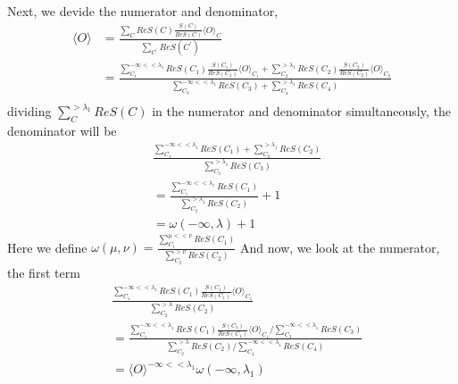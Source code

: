 \documentclass{article}
\begin{document}
    Next, we devide the numerator and denominator,
    \begin{equation}
        \begin{aligned}
            \langle O \rangle &=\frac{ \sum_{C} ReS(C) \frac{S(C)}{ReS(C)} \langle O \rangle_{C} }{ \sum_{C^{\prime}} ReS(C^{\prime}) }\\
            &=\frac{\sum^{-\infty<<\lambda_{1}}_{C_{1}} ReS(C_{1}) \frac{S(C_{1})}{ReS(C_{1})} \langle O \rangle_{C_{1}} + \sum^{>\lambda_{1}}_{C_{2}} ReS(C_{2}) \frac{S(C_{2})}{ReS(C_{2})} \langle O \rangle_{C_{2}}}
            {\sum^{-\infty<<\lambda_{1}}_{C_{3}} ReS(C_{3}) + \sum^{>\lambda_{1}}_{C_{4}} ReS(C_{4})} \\
        \end{aligned}
    \end{equation}
    dividing $\sum^{>\lambda_{1}}_{C} ReS(C)$ in the numerator and denominator simultaneously, the denominator will be
    \begin{equation}
        \begin{aligned}
            &\frac{\sum^{-\infty<<\lambda_{1}}_{C_{1}} ReS(C_{1}) + \sum^{>\lambda_{1}}_{C_{2}} ReS(C_{2})}{\sum^{>\lambda_{1}}_{C_{3}} ReS(C_{3})}\\
            & = \frac{\sum^{-\infty<<\lambda_{1}}_{C_{1}} ReS(C_{1})}{\sum^{>\lambda_{1}}_{C_{2}} ReS(C_{2})} + 1\\
            & = \omega(-\infty,\lambda) + 1
        \end{aligned}
    \end{equation}
    Here we define $\omega(\mu,\nu) = \frac{\sum^{\mu<<\nu}_{C_{1}} ReS(C_{1})}{\sum^{>\nu}_{C_{2}} ReS(C_{2})}$
    And now, we look at the numerator, the first term
    \begin{equation}
        \begin{aligned}
            &\frac{\sum^{-\infty<<\lambda_{1}}_{C_{1}} ReS(C_{1}) \frac{S(C_{1})}{ReS(C_{1})} \langle O \rangle_{C_{1}}}{\sum^{>\lambda}_{C_{2}} ReS(C_{2})} \\
            &=\frac{\sum^{-\infty<<\lambda_{1}}_{C_{1}} ReS(C_{1}) \frac{S(C_{1})}{ReS(C_{1})} \langle O \rangle_{C_{1}} / \sum^{-\infty<<\lambda_{1}}_{C_{3}} ReS(C_{3})}{\sum^{>\lambda}_{C_{2}} ReS(C_{2}) / \sum^{-\infty<<\lambda_{1}}_{C_{4}}ReS(C_{4})} \\
            &=\langle O \rangle^{-\infty<<\lambda_{1}} \omega(-\infty, \lambda_{1})
        \end{aligned}
    \end{equation}
\end{document}
